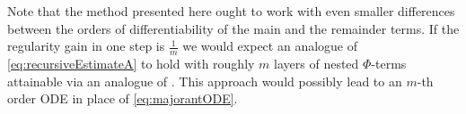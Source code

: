 \label{rem:smallerRegularityGain}
Note that the method presented here ought to work with even smaller differences between the orders of differentiability of the main and the remainder terms. If the regularity gain in one step is $\frac 1 m$ we would expect an analogue of \eqref{eq:recursiveEstimateA} to hold with roughly $m$ layers of nested $\Phi$-terms attainable via an analogue of .
This approach would possibly lead to an $m$-th order ODE in place of \eqref{eq:majorantODE}.
